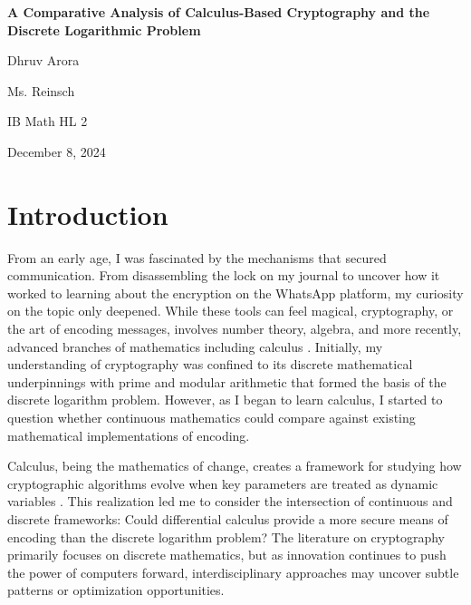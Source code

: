 \documentclass[12pt]{article}
\begin{document}
\begin{titlepage}
    \begin{center}
        \vspace*{2.5in}

        \Large \textbf{A Comparative Analysis of Calculus-Based Cryptography and the Discrete Logarithmic Problem} \\

        \vspace{0.5in}

        \normalsize Dhruv Arora \\

        \vspace{0.05in}

        Ms. Reinsch

        \vspace{0.05in}

        IB Math HL 2

        \vspace{0.05in}

        December 8, 2024

    \end{center}
\end{titlepage}

\newpage

\section*{Introduction}

From an early age, I was fascinated by the mechanisms that secured communication. From disassembling the lock on my journal to uncover how it worked to learning about the encryption on the WhatsApp platform, my curiosity on the topic only deepened. While these tools can feel magical, cryptography, or the art of encoding messages, involves number theory, algebra, and more recently, advanced branches of mathematics including calculus \cite{Loxton1990}. Initially, my understanding of cryptography was confined to its discrete mathematical underpinnings with prime and modular arithmetic that formed the basis of the discrete logarithm problem. However, as I began to learn calculus, I started to question whether continuous mathematics could compare against existing mathematical implementations of encoding.

Calculus, being the mathematics of change, creates a framework for studying how cryptographic algorithms evolve when key parameters are treated as dynamic variables \cite{MITCalculus}. This realization led me to consider the intersection of continuous and discrete frameworks: Could differential calculus provide a more secure means of encoding than the discrete logarithm problem? The literature on cryptography primarily focuses on discrete mathematics, but as innovation continues to push the power of computers forward, interdisciplinary approaches may uncover subtle patterns or optimization opportunities.
\end{document}
